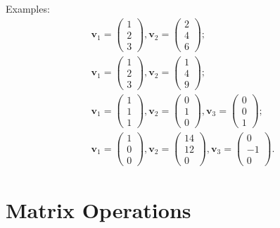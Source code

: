 \documentclass[12pt,oneside,openany]{book}
\begin{document}
Examples: \[
\begin{gathered}
\mathbf{v}_1 = \begin{pmatrix} 1 \\ 2 \\ 3 \end{pmatrix},
\mathbf{v}_2 = \begin{pmatrix} 2 \\ 4 \\ 6 \end{pmatrix}; \\
\mathbf{v}_1 = \begin{pmatrix} 1 \\ 2 \\ 3 \end{pmatrix},
\mathbf{v}_2 = \begin{pmatrix} 1 \\ 4 \\ 9 \end{pmatrix}; \\
\mathbf{v}_1 = \begin{pmatrix} 1 \\ 1 \\ 1 \end{pmatrix},
\mathbf{v}_2 = \begin{pmatrix} 0 \\ 1 \\ 0 \end{pmatrix},
\mathbf{v}_3 = \begin{pmatrix} 0 \\ 0 \\ 1 \end{pmatrix}; \\
\mathbf{v}_1 = \begin{pmatrix} 1 \\ 0 \\ 0 \end{pmatrix},
\mathbf{v}_2 = \begin{pmatrix} 14 \\ 12 \\ 0 \end{pmatrix},
\mathbf{v}_3 = \begin{pmatrix} 0 \\ -1 \\ 0 \end{pmatrix}.
\end{gathered}
\]

\section{Matrix Operations}\label{matrix-operations}
\end{document}
